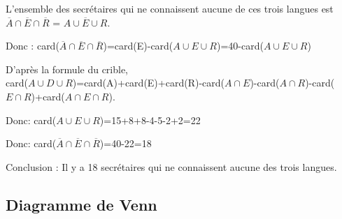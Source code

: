 \documentclass[12pt]{article}
\begin{document}
L'ensemble des secrétaires qui ne connaissent aucune de ces trois langues est $\overline{A}\cap \overline{E}\cap \overline{R}$ = $\overline{A\cup E\cup R}$.

Donc : card($\overline{A}\cap \overline{E}\cap \overline{R}$)=card(E)-card($A\cup E\cup R$)=40-card($A\cup E\cup R$)

D'après la formule du crible,\\
card($A\cup D\cup R$)=card(A)+card(E)+card(R)-card($A\cap E$)-card($A\cap R$)-card($E\cap R$)+card($A\cap E\cap R$).

Donc: card($A\cup E\cup R$)=15+8+8-4-5-2+2=22

Donc: card($\overline{A}\cap \overline{E}\cap \overline{R}$)=40-22=18

Conclusion : Il y a 18 secrétaires qui ne connaissent aucune des trois langues.

\subsection*{Diagramme de Venn}

\begin{center}
\end{center}
\end{document}
